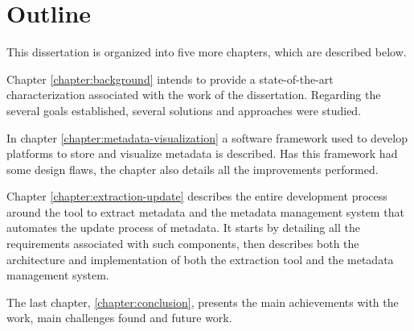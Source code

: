 \section{Outline}
This dissertation is organized into five more chapters, which are described below.

Chapter \ref{chapter:background} intends to provide a state-of-the-art characterization associated with the work of the dissertation.
Regarding the several goals established, several solutions and approaches were studied.

In chapter \ref{chapter:metadata-visualization} a software framework used to develop platforms to store and visualize metadata is described.
Has this framework had some design flaws, the chapter also details all the improvements performed.

Chapter \ref{chapter:extraction-update} describes the entire development process around the tool to extract metadata and the metadata management system that automates the update process of metadata.
It starts by detailing all the requirements associated with such components, then describes both the architecture and implementation of both the extraction tool and the metadata management system.


The last chapter, \ref{chapter:conclusion}, presents the main achievements with the work, main challenges found and future work.

